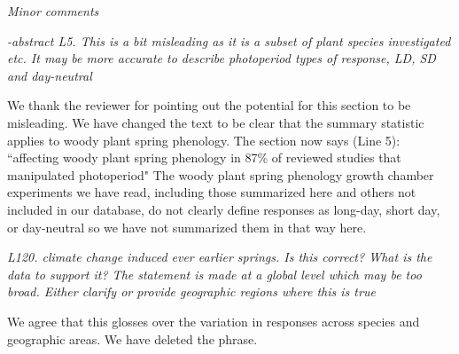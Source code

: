\documentclass{article}
\begin{document}
\par \emph{Minor comments}
\par \emph{-abstract L5. This is a bit misleading as it is a subset of plant species investigated etc. It may be more accurate to describe photoperiod types of response, LD, SD and day-neutral}

\par We thank the reviewer for pointing out the potential for this section to be misleading. We have changed the text to be clear that the summary statistic applies to woody plant spring phenology. The section now says (Line 5): 
``affecting woody plant spring phenology in 87\% of reviewed studies that manipulated photoperiod"
The woody plant spring phenology growth chamber experiments we have read, including those summarized here and others not included in our database, do not clearly define responses as long-day, short day, or day-neutral so we have not summarized them in that way here. 
\par \emph{L120. climate change induced ever earlier springs. Is this correct? What is the data to support it? The statement is made at a global level which may be too broad. Either clarify or provide geographic regions where this is true}
\par We agree that this glosses over the variation in responses across species and geographic areas. We have deleted the phrase. 
\end{document}
